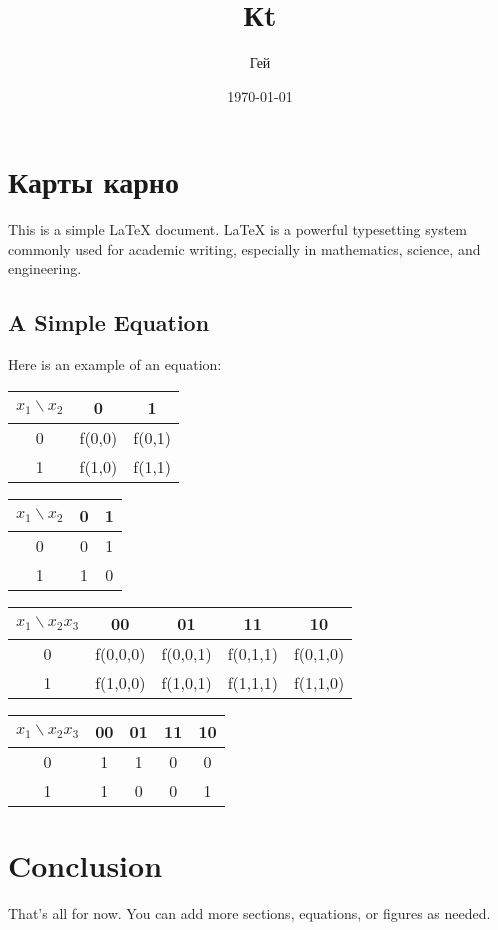 \documentclass{article}
\title{Кt}
\author{Гей}
\date{\today}
\begin{document}
\maketitle

\section{Карты карно}

This is a simple LaTeX document. LaTeX is a powerful typesetting system commonly used for academic writing, especially in mathematics, science, and engineering.

\subsection{A Simple Equation}

Here is an example of an equation:

\begin{tabular}{c|c|c}
$x_{1} \backslash x_{2}$ & 0 & 1 \\
\hline
0 & f(0,0) & f(0,1) \\
1 & f(1,0) & f(1,1) \\
\end{tabular}

\begin{tabular}{c|c|c}
$x_{1} \backslash x_{2}$ & 0 & 1 \\
\hline
0 & 0 & 1 \\
1 & 1 & 0 \\
\end{tabular}

\begin{tabular}{c|c|c|c|c}
$x_{1} \backslash x_{2}x_{3} $ & 00 & 01 & 11 & 10 \\
\hline
0 & f(0,0,0) & f(0,0,1) & f(0,1,1) & f(0,1,0) \\
1 & f(1,0,0) & f(1,0,1) & f(1,1,1) & f(1,1,0) \\
\end{tabular}

\begin{tabular}{c|c|c|c|c}
$x_{1} \backslash x_{2}x_{3} $ & 00 & 01 & 11 & 10 \\
\hline
0 & 1 & 1 & 0 & 0 \\
1 & 1 & 0 & 0 & 1 \\
\end{tabular}

\section{Conclusion}

That's all for now. You can add more sections, equations, or figures as needed.
\end{document}
